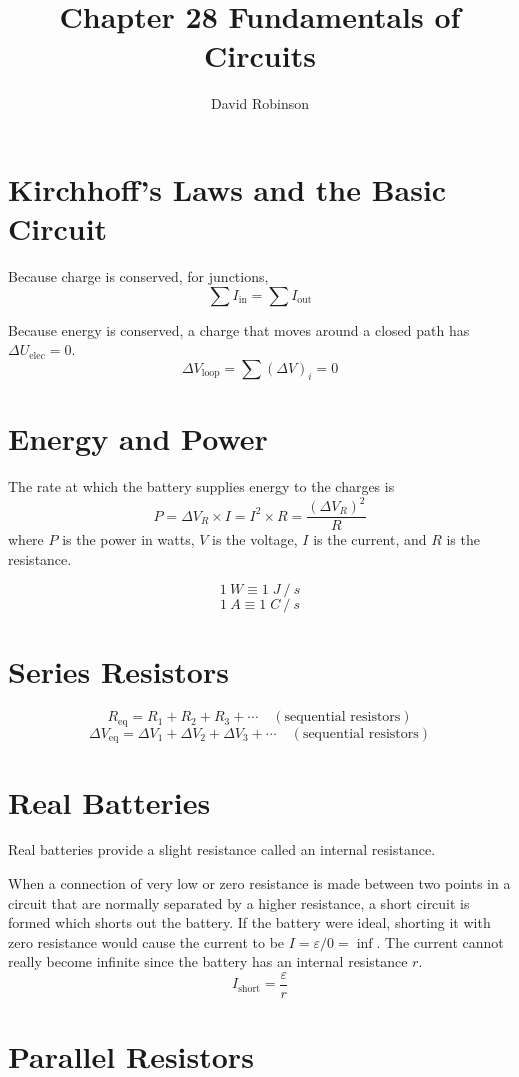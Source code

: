 \documentclass{article}
\title{Chapter 28 Fundamentals of Circuits}
\author{David Robinson}
\date{}
\begin{document}
\maketitle

\section*{Kirchhoff's Laws and the Basic Circuit}
Because charge is conserved, for junctions,
\[\sum I_\text{in}=\sum I_\text{out}\]

Because energy is conserved, a charge that moves around a closed path has $\Delta U_\text{elec}=0$.
\[\Delta V_\text{loop}=\sum {(\Delta V)}_i=0\]

\section*{Energy and Power}
The rate at which the battery supplies energy to the charges is
\[P=\Delta V_R\times I=I^2 \times R=\frac{{(\Delta V_R)}^2}{R}\] where $P$ is the power in watts,
$V$ is the voltage, $I$ is the current, and $R$ is the resistance.

\[1\: W \equiv 1\; J\: /\: s\]
\[1\: A \equiv 1\; C\: /\: s\]
\section*{Series Resistors}

\[R_\text{eq}=R_1 + R_2 + R_3 + \cdots\quad (\text{sequential resistors})\]
\[\Delta V_\text{eq}=\Delta V_1 + \Delta V_2 + \Delta V_3 + \cdots\quad
(\text{sequential resistors})\]

\section*{Real Batteries}
Real batteries provide a slight resistance called an internal resistance.

\vspace{1em}

When a connection of very low or zero resistance is made between two points in a circuit that are
normally separated by a higher resistance, a short circuit is formed which shorts out the battery.
If the battery were ideal, shorting it with zero resistance would cause the current to be
$I=\varepsilon / 0=\inf$. The current cannot really become infinite since the battery has an
internal resistance $r$.
\[I_\text{short}=\frac{\varepsilon}{r}\]

\section*{Parallel Resistors}
\end{document}
